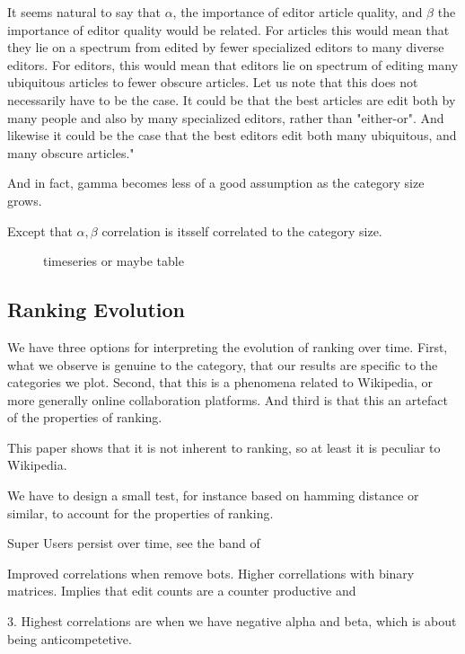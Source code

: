 \documentclass{acm_proc_article-sp}
\begin{document}
It seems natural to say that $\alpha$, the importance of editor article quality, and $\beta$ the importance of editor quality would be related. For articles this would mean that they lie on a spectrum from  edited by fewer specialized editors to  many diverse editors. For editors, this would mean that editors lie on spectrum of editing many ubiquitous articles to fewer obscure articles. Let us note that this does not necessarily have to be the case. It could be that the best articles are edit both by many people and also by many specialized editors, rather than "either-or". And likewise it could be the case that  the best editors edit both many ubiquitous, and many obscure articles."

And in fact, gamma becomes less of a good assumption as the category size grows. 

Except that $\alpha , \beta$ correlation is itsself correlated to the category size.





\begin{figure}[!t]
\centering
\caption{timeseries or maybe table}
\label{timeseries or maybe table}
\end{figure}

\subsection{Ranking Evolution}
We have three options for interpreting the evolution of ranking over time. First, what we observe is genuine to the category, that our results are specific to the categories we plot. Second, that this is a phenomena related to Wikipedia, or more generally online collaboration platforms. And third is that this an artefact of the properties of ranking. 

This paper \cite{bloom} shows that it is not inherent to ranking, so at least it is peculiar to Wikipedia. 

We have to design a small test, for instance based on hamming distance or similar, to account for the properties of ranking. 


Super Users persist over time, see the band of 




Improved correlations when remove bots. Higher correllations with binary matrices. 
Implies that edit counts are a counter productive and 


3. Highest correlations are when we have negative alpha and beta, which is about being anticompetetive. 
\end{document}
